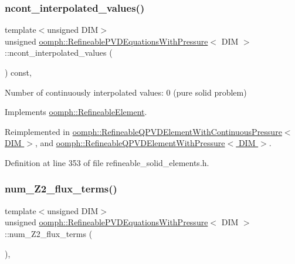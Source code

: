 \subsubsection{\texorpdfstring{ncont\+\_\+interpolated\+\_\+values()}{ncont\_interpolated\_values()}}
{\footnotesize\ttfamily template$<$unsigned D\+IM$>$ \\
unsigned \hyperlink{classoomph_1_1RefineablePVDEquationsWithPressure}{oomph\+::\+Refineable\+P\+V\+D\+Equations\+With\+Pressure}$<$ D\+IM $>$\+::ncont\+\_\+interpolated\+\_\+values (\begin{DoxyParamCaption}{ }\end{DoxyParamCaption}) const\hspace{0.3cm}{\ttfamily [inline]}, {\ttfamily [virtual]}}



Number of continuously interpolated values\+: 0 (pure solid problem) 



Implements \hyperlink{classoomph_1_1RefineableElement_a53e171a18c9f43f1db90a6876516a073}{oomph\+::\+Refineable\+Element}.



Reimplemented in \hyperlink{classoomph_1_1RefineableQPVDElementWithContinuousPressure_ace99412d0a2d0015ce56c3ee4c375254}{oomph\+::\+Refineable\+Q\+P\+V\+D\+Element\+With\+Continuous\+Pressure$<$ D\+I\+M $>$}, and \hyperlink{classoomph_1_1RefineableQPVDElementWithPressure_aa73ec04c55ee434543ee171bdd1da914}{oomph\+::\+Refineable\+Q\+P\+V\+D\+Element\+With\+Pressure$<$ D\+I\+M $>$}.



Definition at line 353 of file refineable\+\_\+solid\+\_\+elements.\+h.

\mbox{\label{classoomph_1_1RefineablePVDEquationsWithPressure_a1d386c66a1d4124ba63d344bdc6a2bd2}} 
\subsubsection{\texorpdfstring{num\+\_\+\+Z2\+\_\+flux\+\_\+terms()}{num\_Z2\_flux\_terms()}}
{\footnotesize\ttfamily template$<$unsigned D\+IM$>$ \\
unsigned \hyperlink{classoomph_1_1RefineablePVDEquationsWithPressure}{oomph\+::\+Refineable\+P\+V\+D\+Equations\+With\+Pressure}$<$ D\+IM $>$\+::num\+\_\+\+Z2\+\_\+flux\+\_\+terms (\begin{DoxyParamCaption}{ }\end{DoxyParamCaption})\hspace{0.3cm}{\ttfamily [inline]}, {\ttfamily [virtual]}}



